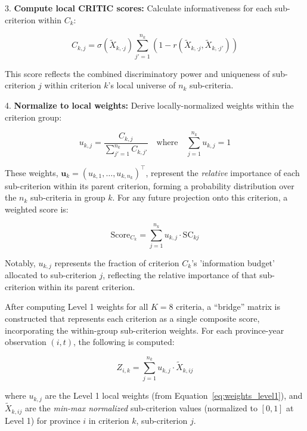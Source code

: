 \documentclass[12pt,a4paper]{article}
\begin{document}
3. \textbf{Compute local CRITIC scores:} Calculate informativeness for each sub-criterion within $C_k$:

\begin{equation}
\label{eq:critic_level1}
C_{k,j} = \sigma(\tilde{X}_{k,\cdot j}) \sum_{j'=1}^{n_k} \left(1 - r(\tilde{X}_{k,\cdot j}, \tilde{X}_{k,\cdot j'})\right)
\end{equation}

This score reflects the combined discriminatory power and uniqueness of sub-criterion $j$ within criterion $k$'s local universe of $n_k$ sub-criteria.

4. \textbf{Normalize to local weights:} Derive locally-normalized weights within the criterion group:

\begin{equation}
\label{eq:weights_level1}
u_{k,j} = \frac{C_{k,j}}{\sum_{j'=1}^{n_k} C_{k,j'}} \quad \text{where} \quad \sum_{j=1}^{n_k} u_{k,j} = 1
\end{equation}

These weights, $\mathbf{u}_k = (u_{k,1}, \ldots, u_{k,n_k})^\top$, represent the \emph{relative} importance of each sub-criterion within its parent criterion, forming a probability distribution over the $n_k$ sub-criteria in group $k$. For any future projection onto this criterion, a weighted score is:

\begin{equation}
\text{Score}_{C_k} = \sum_{j=1}^{n_k} u_{k,j} \cdot \text{SC}_{kj}
\end{equation}

Notably, $u_{k,j}$ represents the fraction of criterion $C_k$'s 'information budget' allocated to sub-criterion $j$, reflecting the relative importance of that sub-criterion within its parent criterion.

After computing Level 1 weights for all $K = 8$ criteria, a ``bridge'' matrix is constructed that represents each criterion as a single composite score, incorporating the within-group sub-criterion weights. For each province-year observation $(i, t)$, the following is computed:

\begin{equation}
\label{eq:criterion_composite}
Z_{i,k} = \sum_{j=1}^{n_k} u_{k,j} \cdot \tilde{X}_{k,ij}
\end{equation}

where $u_{k,j}$ are the Level 1 local weights (from Equation~\eqref{eq:weights_level1}), and $\tilde{X}_{k,ij}$ are the \emph{min-max normalized} sub-criterion values (normalized to $[0,1]$ at Level 1) for province $i$ in criterion $k$, sub-criterion $j$.
\end{document}

